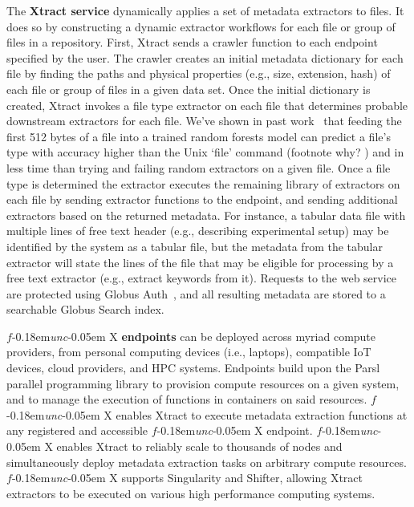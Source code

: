\documentclass[sigconf, 9pt]{acmart}
\newcommand{\kyle}[1]{}
\newcommand{\kyle}[1]{{\textcolor{purple}{ Kyle: #1 }}}
\newcommand{\name}{Xtract}
\newcommand{\funcx}{$f$\kern-0.18em\emph{unc}\kern-0.05em X}
\begin{document}
The \textbf{\name{} service} dynamically applies a set of metadata extractors to files. 
It does so by constructing a dynamic extractor workflows for each file 
or group of files in a repository.  
First, \name{} sends a crawler function to each endpoint specified by the user.  The crawler creates an 
initial metadata dictionary for each file by finding the paths and physical properties (e.g., size, extension, hash) of each file or group of files
in a given data set.  Once the initial dictionary is created, \name{} invokes a file type extractor on each file that determines probable downstream extractors for each file. We've shown in past work~\cite{skluzacek2018skluma} that feeding the first 512 bytes of a file into 
a trained random forests model can predict a file's type with accuracy higher than the Unix `file' command (footnote why? \kyle{does this use magic bits?}) and in less time
than trying and failing random extractors on a given file. Once a file type is determined the extractor executes the remaining library of extractors 
on each file by sending extractor functions to the endpoint, and sending additional extractors based on the returned metadata.  For instance, 
a tabular data file with multiple lines of free text header (e.g., describing experimental setup) may be identified by the system as a tabular file, but 
the metadata from the tabular 
extractor will state the lines of the file that may be eligible for processing by a free text extractor (e.g., extract keywords from it).
Requests to the web service are protected using Globus Auth~\cite{tuecke2016globus}, and all resulting metadata are stored to a searchable Globus Search index. 

\funcx{} \textbf{endpoints} can be deployed across myriad compute providers, from personal computing devices (i.e., laptops), compatible 
IoT devices, cloud providers, and HPC systems.  Endpoints build upon the Parsl~\cite{babuji2019parsl} parallel programming library to 
provision compute resources on a given system, and to manage the execution of functions in containers on said resources. \funcx{} enables 
\name{} to execute metadata extraction functions at any registered and accessible \funcx{} endpoint.  \funcx{} enables \name{} to reliably 
scale to thousands of nodes and simultaneously deploy metadata extraction tasks on arbitrary compute resources. 
\funcx{} supports Singularity and Shifter, allowing \name{} extractors to be executed
on various high performance computing systems. 
\end{document}
